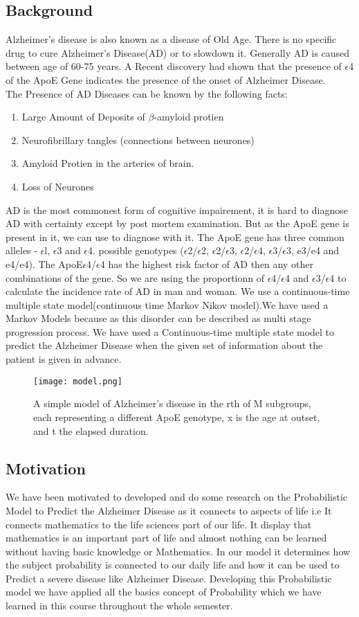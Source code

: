 \documentclass{article}
\begin{document}
\subsection{Background}
Alzheimer’s disease is also known as a disease of Old Age. There is no specific drug to cure Alzheimer's Disease(AD) or to slowdown it. Generally AD is caused between age of 60-75 years. A Recent discovery had shown that the presence of $\epsilon$4\cite{1} of the ApoE Gene indicates the presence of the onset of Alzheimer Disease.
\\ The Presence of AD Diseases can be known by the following facts:
\begin{enumerate}
    \item Large Amount of Deposits of $\beta$-amyloid protien
    \item Neurofibrillary tangles (connections between neurones)
    \item Amyloid Protien in the arteries of brain.
    \item Loss of Neurones
\end{enumerate}
AD is the most commonest form of cognitive impairement, it is hard to diagnose AD with certainty except by post mortem examination. But as the ApoE gene is present in it, we can use to diagnose with it. The ApoE gene has three common alleles - $\epsilon$l, $\epsilon$3 and $\epsilon$4. possible genotypes ($\epsilon$2/$\epsilon$2, $\epsilon$2/$\epsilon$3, $\epsilon$2/$\epsilon$4, $\epsilon$3/$\epsilon$3, e3/e4 and e4/e4). The ApoE$ \epsilon$4/$\epsilon$4 has the highest risk factor of AD then any other combinations of the gene. So we are using the proportionn of $\epsilon$4/$\epsilon$4 and $\epsilon$3/$\epsilon$4\cite{2} to calculate the incidence rate of AD in man and woman. We use a\cite{3} continuous-time multiple state model(continuous time Markov Nikov model).We have used a Markov Models because as this disorder can be described as multi stage progression process.
\newpage
We have used a Continuous-time multiple state model to predict the Alzheimer Disease when the given set of information about the patient is given in advance.
\begin{figure}[htp]
    \centering
    \texttt{[image: model.png]}
    \caption{A simple model of Alzheimer's disease in the rth of M subgroups, each representing a different
ApoE genotype, x is the age at outset, and t the elapsed duration.}
    \label{fig:Plot}
\end{figure}
\subsection{Motivation}
We have been motivated to developed and do some research on the Probabilistic Model to Predict the Alzheimer Disease as it connects to aspects of life i.e It connects mathematics to the life sciences part of our life. It display that mathematics is an important part of life and almost nothing can be learned without having basic knowledge or Mathematics. In our model it determines how the subject probability is connected to our daily life and how it can be used to Predict a severe disease like Alzheimer Disease. Developing this Probabilistic model we have applied all the basics concept of Probability which we have learned in this course throughout the whole semester.
\end{document}
